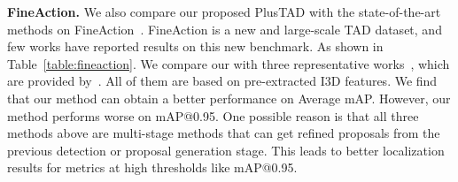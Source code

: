 \documentclass[a4paper,fleqn]{cas-dc}
\begin{document}
\begin{table*}[t]
\centering
\small
\caption{\textbf{Comparison with state of the art on the ActivityNet-1.3 dataset.} ``RGB-Only" means whether to use other input modalities besides RGB input. }
\setlength\tabcolsep{4.45mm}
\label{table:anet}
\end{table*}


\textbf{FineAction.}
We also compare our proposed PlusTAD with the state-of-the-art methods on FineAction~\citep{fineaction}. FineAction is a new and large-scale TAD dataset, and few works have reported results on this new benchmark.
As shown in Table~\ref{table:fineaction}. 
We compare our  with three representative works~\citep{bmn,dbg,g-tad}, which are provided by~\citep{fineaction}. All of them are based on pre-extracted I3D features. We find that our method can obtain a better performance on Average mAP. 
However, our method performs worse on mAP@0.95. 
One possible reason is that all three methods above are multi-stage methods that can get refined proposals from the previous detection or proposal generation stage. This leads to better localization results for metrics at high thresholds like mAP@0.95.
\end{document}
